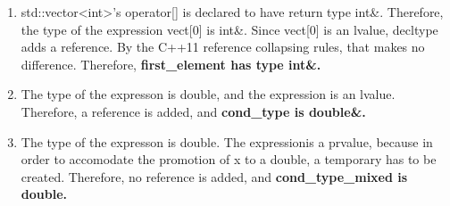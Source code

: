 \documentclass[a4paper,11pt,twoside]{book}
\begin{document}
\begin{itemize}
\begin{enumerate}
		\item std::vector<int>'s operator[] is declared to have return type int\&. Therefore, the type of the expression vect[0] is int\&. Since vect[0] is an lvalue, decltype adds a reference. By the C++11 reference collapsing rules, that makes no difference. Therefore, \textbf{first\_element has type int\&.}  
		
		\item  The type of the expresson is double, and the expression
is an lvalue. Therefore, a reference is added, and
\textbf{cond\_type is double\&.}
		
		\item The type of the expresson is double. The expressionis a prvalue, because in order to accomodate the promotion of x to a double, a temporary has to be created. Therefore, no reference is added, and \textbf{cond\_type\_mixed is double.}
	\end{enumerate}

\end{itemize}
\end{document}
